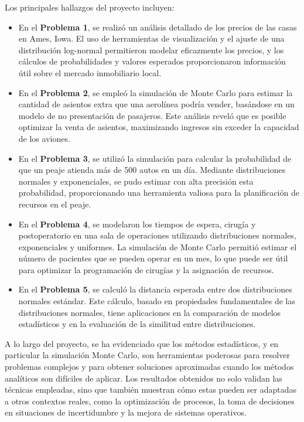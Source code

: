 \documentclass[12pt]{article}
\begin{document}
Los principales hallazgos del proyecto incluyen:

\begin{itemize}
    \item En el \textbf{Problema 1}, se realizó un análisis detallado de los precios de las casas en Ames, Iowa. El uso de herramientas de visualización y el ajuste de una distribución log-normal permitieron modelar eficazmente los precios, y los cálculos de probabilidades y valores esperados proporcionaron información útil sobre el mercado inmobiliario local.
    
    \item En el \textbf{Problema 2}, se empleó la simulación de Monte Carlo para estimar la cantidad de asientos extra que una aerolínea podría vender, basándose en un modelo de no presentación de pasajeros. Este análisis reveló que es posible optimizar la venta de asientos, maximizando ingresos sin exceder la capacidad de los aviones.
    
    \item En el \textbf{Problema 3}, se utilizó la simulación para calcular la probabilidad de que un peaje atienda más de 500 autos en un día. Mediante distribuciones normales y exponenciales, se pudo estimar con alta precisión esta probabilidad, proporcionando una herramienta valiosa para la planificación de recursos en el peaje.
    
    \item En el \textbf{Problema 4}, se modelaron los tiempos de espera, cirugía y postoperatorio en una sala de operaciones utilizando distribuciones normales, exponenciales y uniformes. La simulación de Monte Carlo permitió estimar el número de pacientes que se pueden operar en un mes, lo que puede ser útil para optimizar la programación de cirugías y la asignación de recursos.
    
    \item En el \textbf{Problema 5}, se calculó la distancia esperada entre dos distribuciones normales estándar. Este cálculo, basado en propiedades fundamentales de las distribuciones normales, tiene aplicaciones en la comparación de modelos estadísticos y en la evaluación de la similitud entre distribuciones.
\end{itemize}

A lo largo del proyecto, se ha evidenciado que los métodos estadísticos, y en particular la simulación Monte Carlo, son herramientas poderosas para resolver problemas complejos y para obtener soluciones aproximadas cuando los métodos analíticos son difíciles de aplicar. Los resultados obtenidos no solo validan las técnicas empleadas, sino que también muestran cómo estas pueden ser adaptadas a otros contextos reales, como la optimización de procesos, la toma de decisiones en situaciones de incertidumbre y la mejora de sistemas operativos.
\end{document}
